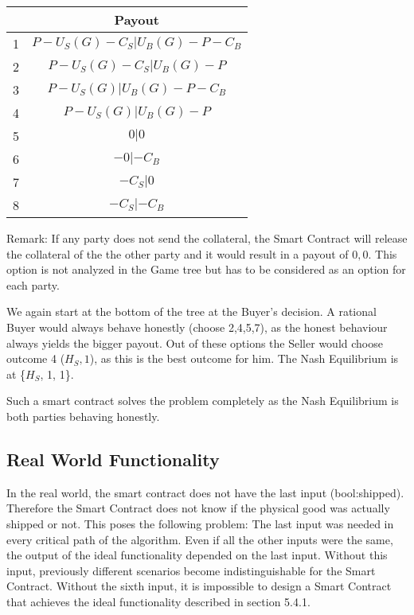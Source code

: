 \documentclass{cacthesis}
\begin{document}
\begin{center}
\begin{tabular}{ |c|c| }
\hline
& Payout  \\
\hline
\hline
1& $P -U_S(G) - C_S| U_B(G)-P - C_B$\\
\hline
2& $P-U_S(G)- C_S| U_B(G)-P $\\
\hline
3&$P-U_S(G) | U_B(G)-P - C_B$ \\
\hline
4& $P-U_S(G)| U_B(G)-P$\\
\hline
5& $0|0$\\
\hline 
6& $-0 |- C_B$\\
\hline
7& $- C_S|0$\\
\hline
8& $-C_S| -C_B$\\
\hline
\end{tabular}
\end{center}

Remark: If any party does not send the collateral, the Smart Contract will release the collateral of the the other party and it would result in a payout of $0,0$. This option is not analyzed in the Game tree but has to be considered as an option for each party.\newline

We again start at the bottom of the tree at the Buyer's decision. A rational Buyer would always behave honestly (choose 2,4,5,7), as the honest behaviour always yields the bigger payout. Out of these options the Seller would choose outcome 4 ($H_S,1$), as this is the best outcome for him.\newline
The Nash Equilibrium is at \{$H_S$, 1, 1\}.\newline

Such a smart contract solves the problem completely as the Nash Equilibrium is both parties behaving honestly.
\subsection{Real World Functionality}
In the real world, the smart contract does not have the last input (bool:shipped). Therefore the Smart Contract does not know if the physical good was actually shipped or not. \newline
This poses the following problem: The last input was needed in every critical path of the algorithm. Even if all the other inputs were the same, the output of the ideal functionality depended on the last input. Without this input, previously different scenarios become indistinguishable for the Smart Contract. Without the sixth input, it is impossible to design a Smart Contract that achieves the ideal functionality described in section 5.4.1.
\end{document}
